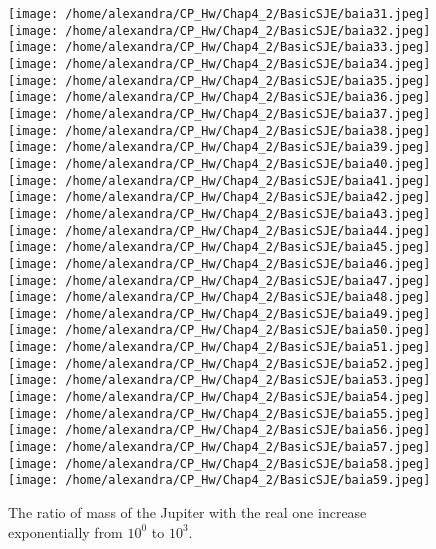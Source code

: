 \documentclass[11pt,twoside,a4paper]{article}
\begin{document}
\begin{figure}[htbp]
\texttt{[image: /home/alexandra/CP\_Hw/Chap4\_2/BasicSJE/baia31.jpeg]}
\texttt{[image: /home/alexandra/CP\_Hw/Chap4\_2/BasicSJE/baia32.jpeg]}
\texttt{[image: /home/alexandra/CP\_Hw/Chap4\_2/BasicSJE/baia33.jpeg]}
\texttt{[image: /home/alexandra/CP\_Hw/Chap4\_2/BasicSJE/baia34.jpeg]}
\texttt{[image: /home/alexandra/CP\_Hw/Chap4\_2/BasicSJE/baia35.jpeg]}
\texttt{[image: /home/alexandra/CP\_Hw/Chap4\_2/BasicSJE/baia36.jpeg]}
\texttt{[image: /home/alexandra/CP\_Hw/Chap4\_2/BasicSJE/baia37.jpeg]}
\texttt{[image: /home/alexandra/CP\_Hw/Chap4\_2/BasicSJE/baia38.jpeg]}
\texttt{[image: /home/alexandra/CP\_Hw/Chap4\_2/BasicSJE/baia39.jpeg]}
\texttt{[image: /home/alexandra/CP\_Hw/Chap4\_2/BasicSJE/baia40.jpeg]}
\texttt{[image: /home/alexandra/CP\_Hw/Chap4\_2/BasicSJE/baia41.jpeg]}
\texttt{[image: /home/alexandra/CP\_Hw/Chap4\_2/BasicSJE/baia42.jpeg]}
\texttt{[image: /home/alexandra/CP\_Hw/Chap4\_2/BasicSJE/baia43.jpeg]}
\texttt{[image: /home/alexandra/CP\_Hw/Chap4\_2/BasicSJE/baia44.jpeg]}
\texttt{[image: /home/alexandra/CP\_Hw/Chap4\_2/BasicSJE/baia45.jpeg]}
\texttt{[image: /home/alexandra/CP\_Hw/Chap4\_2/BasicSJE/baia46.jpeg]}
\texttt{[image: /home/alexandra/CP\_Hw/Chap4\_2/BasicSJE/baia47.jpeg]}
\texttt{[image: /home/alexandra/CP\_Hw/Chap4\_2/BasicSJE/baia48.jpeg]}
\texttt{[image: /home/alexandra/CP\_Hw/Chap4\_2/BasicSJE/baia49.jpeg]}
\texttt{[image: /home/alexandra/CP\_Hw/Chap4\_2/BasicSJE/baia50.jpeg]}
\texttt{[image: /home/alexandra/CP\_Hw/Chap4\_2/BasicSJE/baia51.jpeg]}
\texttt{[image: /home/alexandra/CP\_Hw/Chap4\_2/BasicSJE/baia52.jpeg]}
\texttt{[image: /home/alexandra/CP\_Hw/Chap4\_2/BasicSJE/baia53.jpeg]}
\texttt{[image: /home/alexandra/CP\_Hw/Chap4\_2/BasicSJE/baia54.jpeg]}
\texttt{[image: /home/alexandra/CP\_Hw/Chap4\_2/BasicSJE/baia55.jpeg]}
\texttt{[image: /home/alexandra/CP\_Hw/Chap4\_2/BasicSJE/baia56.jpeg]}
\texttt{[image: /home/alexandra/CP\_Hw/Chap4\_2/BasicSJE/baia57.jpeg]}
\texttt{[image: /home/alexandra/CP\_Hw/Chap4\_2/BasicSJE/baia58.jpeg]}
\texttt{[image: /home/alexandra/CP\_Hw/Chap4\_2/BasicSJE/baia59.jpeg]}

\caption{The ratio of mass of the Jupiter with the real one increase exponentially from $10^0$ to $10^3$.}
\label{fig4}
\end{figure}
\end{document}
